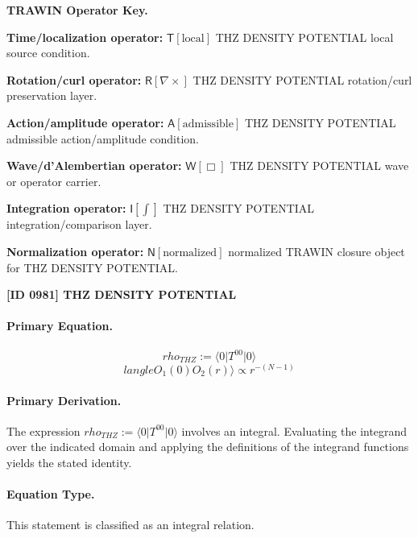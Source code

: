 \par\vspace{0.45\baselineskip}
\noindent\begin{minipage}[t]{\linewidth}
\begingroup
\small
\raggedright
\textbf{TRAWIN Operator Key.}\par
\noindent\textbf{Time/localization operator:} $\mathsf{T}\!\left[\mathrm{local}\right]$ THZ DENSITY POTENTIAL local source condition.\par
\noindent\textbf{Rotation/curl operator:} $\mathsf{R}\!\left[\nabla\times\right]$ THZ DENSITY POTENTIAL rotation/curl preservation layer.\par
\noindent\textbf{Action/amplitude operator:} $\mathsf{A}\!\left[\mathrm{admissible}\right]$ THZ DENSITY POTENTIAL admissible action/amplitude condition.\par
\noindent\textbf{Wave/d'Alembertian operator:} $\mathsf{W}\!\left[\Box\right]$ THZ DENSITY POTENTIAL wave or operator carrier.\par
\noindent\textbf{Integration operator:} $\mathsf{I}\!\left[\int\right]$ THZ DENSITY POTENTIAL integration/comparison layer.\par
\noindent\textbf{Normalization operator:} $\mathsf{N}\!\left[\mathrm{normalized}\right]$ normalized TRAWIN closure object for THZ DENSITY POTENTIAL.\par
\endgroup
\end{minipage}

\clearpage
\noindent\textbf{[ID 0981] THZ DENSITY POTENTIAL}\par
\vspace{0.35em}
\paragraph{Primary Equation.}
\[
rho_{THZ}:=\langle0|T^{00}\lvert 0 \rangle
\]
\[
langle O_1(0) O_2(r) \rangle \propto r^{-(N-1)}
\]

\paragraph{Primary Derivation.}
The expression \( rho_{THZ}:=\langle0|T^{00}\lvert 0 \rangle \) involves an integral. Evaluating the integrand over the indicated domain and applying the definitions of the integrand functions yields the stated identity.
\paragraph{Equation Type.}
This statement is classified as an integral relation.

